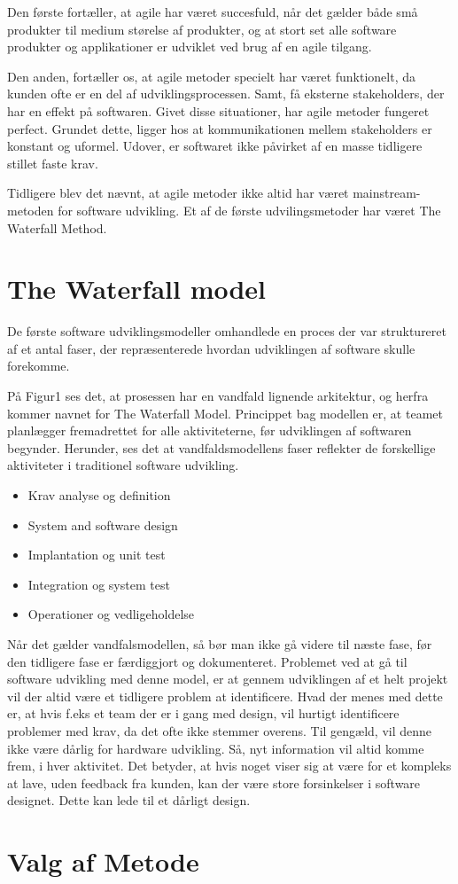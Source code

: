 Den første fortæller, at agile har været succesfuld, når det gælder både små produkter til medium størelse af produkter, og at stort set alle software produkter og applikationer er udviklet ved brug af en agile tilgang. 

Den anden, fortæller os, at agile metoder specielt har været funktionelt, da kunden ofte er  en del af udviklingsprocessen. Samt, få eksterne stakeholders, der har en effekt på softwaren. \cite{Sommerville}
Givet disse situationer, har agile metoder fungeret perfect. Grundet dette, ligger hos at kommunikationen mellem stakeholders er konstant og uformel. Udover, er softwaret ikke påvirket af en masse tidligere stillet faste krav. 

Tidligere blev det nævnt, at agile metoder ikke altid har været mainstream-metoden for software udvikling. Et af de første udvilingsmetoder har været The Waterfall Method.

\section{The Waterfall model}
De første software udviklingsmodeller omhandlede en proces der var struktureret af et antal faser, der repræsenterede hvordan udviklingen af software skulle forekomme. \cite{Sommerville}



På Figur1 ses det, at prosessen har en vandfald lignende arkitektur, og herfra kommer navnet for The Waterfall Model. Princippet bag modellen er, at teamet planlægger fremadrettet for alle aktiviteterne, før udviklingen af softwaren begynder. Herunder, ses det at vandfaldsmodellens faser reflekter de forskellige aktiviteter i traditionel software udvikling. \cite{Sommerville}
\begin{itemize}
    \item Krav analyse og definition 
    \item System and software design
    \item Implantation og unit test
    \item Integration og system test 
    \item Operationer og vedligeholdelse 
\end{itemize}

Når det gælder vandfalsmodellen, så bør man ikke gå videre til næste fase, før den tidligere fase er færdiggjort og dokumenteret. Problemet ved at gå til software udvikling med denne model, er at gennem udviklingen af et helt projekt vil der altid være et tidligere problem at identificere. Hvad der menes med dette er, at hvis f.eks et team der er i gang med design, vil hurtigt identificere problemer med krav, da det ofte ikke stemmer overens. Til gengæld, vil denne ikke være dårlig for hardware udvikling. Så, nyt information vil altid komme frem, i hver aktivitet. Det betyder, at hvis noget viser sig at være for et kompleks at lave, uden feedback fra kunden, kan der være store forsinkelser i software designet. Dette kan lede til et dårligt design. \cite{Sommerville}

\section{Valg af Metode}


